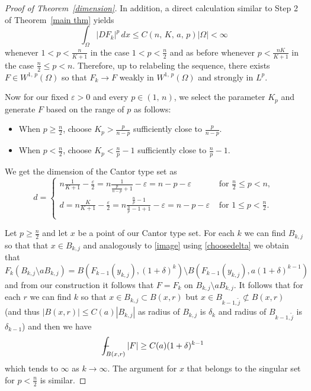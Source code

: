 \documentclass[reqno,11pt]{amsart}
\def\ez{\epsilon}
\def\epsilon{\varepsilon}
\numberwithin{equation}{section}
\theoremstyle{remark}
\begin{document}
\begin{proof}[Proof of Theorem~\ref{dimension}]
In addition, a direct calculation similar to Step 2 of Theorem~\ref{main thm} yields 
$$\int_{\Omega} |DF_k|^p\,dx\le C(n,\,K,\,a,\,p)|\Omega|<\infty$$
whenever $1< p<\frac{n}{K+1}$ in the case $1< p<\frac{n}{2}$ and as before whenever $p<\frac{nK}{K+1}$ in the case $\frac{n}{2}\leq p<n$. Therefore, up to relabeling the sequence, there exists $F\in W^{1,\,p}(\Omega)$ so that $F_k\to F$ weakly in $W^{1,\,p}(\Omega)$ and strongly in $L^p$. 

Now for our fixed $\ez>0$ and every $p\in\left(1,\,n\right)$, we select the parameter $K_p$ and generate $F$ based on the range of $p$ as follows:
\begin{itemize}
    \item When $p\ge \frac n 2$, choose $K_p>\frac{p}{n-p}$ sufficiently close to $\frac{p}{n-p}$.
    \item When $p<\frac n 2$, choose $K_p<\frac n p -1$ sufficiently close to $\frac n p -1$.
\end{itemize}
We get the dimension of the Cantor type set as 
$$
d=
\begin{cases}
n\frac{1}{K+1}-\frac{\epsilon}{2}=n\frac{1}{\frac{p}{n-p}+1}-\epsilon=n-p-\epsilon&\text{ for }\frac{n}{2}\leq p<n,\\
d=n\frac{K}{K+1}-\frac{\epsilon}{2}=n\frac{\frac{n}{p}-1}{\frac{n}{p}-1+1}-\epsilon=n-p-\epsilon&\text{ for }1\leq p<\frac{n}{2}.\\
\end{cases}
$$

Let $p\geq \frac{n}{2}$ and let $x$ be a point of our Cantor type set. For each $k$ we  can find $B_{k,j}$ so that that $x\in B_{k,j}$ 
and analogously to \eqref{image} using \eqref{choosedelta} we obtain that 
$$
F_k(B_{k,j}\setminus a B_{k,j})=
B(F_{k-1}(y_{k,j}),(1+\delta)^{k})\setminus B(F_{k-1}(y_{k,j}),a(1+\delta)^{k-1})
$$
and from our construction it follows that $F=F_k$ on $B_{k,j}\setminus a B_{k,j}$. 
It follows that for each $r$ we can find $k$ so that $x\in B_{k,j}\subset B(x,r)$ but $x\in B_{k-1,\tilde{j}}\not\subset B(x,r)$ (and thus $|B(x,r)|\leq C(a)|B_{k,j}|$ as radius of $B_{k,j}$ is $\delta_k$ and radius of $B_{k-1,\tilde{j}}$ is $\delta_{k-1}$) and then
 we have
$$
-\hskip -12pt\int_{B(x,r)} |F|\geq C(a)(1+\delta)^{k-1}
$$
which tends to $\infty$ as $k\to \infty$. 
The argument for $x$ that belongs to the singular set for $p<\frac{n}{2}$ is similar. 
\end{proof}
\end{document}
